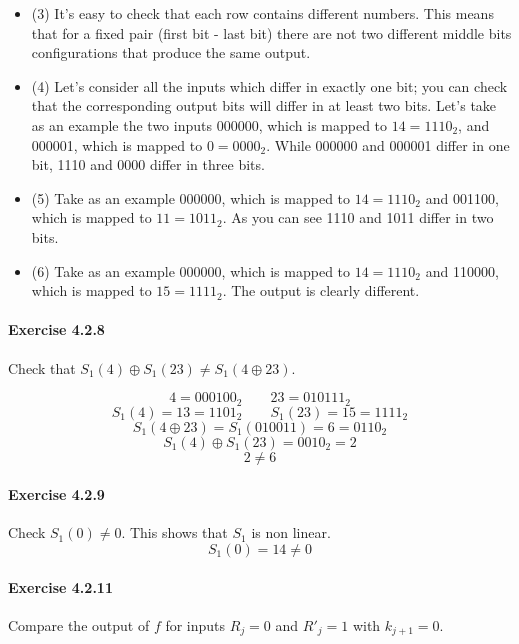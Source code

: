 \documentclass{article}
\begin{document}
  \begin{itemize}
	\item (3) It's easy to check that each row contains different
	  numbers. This means that for a fixed pair (first bit - last bit)
	  there are not two different middle bits configurations that produce the
	  same output.
	\item (4) Let's consider all the inputs which differ in exactly
	  one bit; you can check that the corresponding output bits will
	  differ in at least two bits. Let's take as an example the two
	  inputs 000000, which is mapped to 
	  $14 = 1110_{2}$, and 000001, which is mapped
	  to $0 = 0000_{2}$. While 000000 and
	  000001 differ in one bit, 1110 and
	  0000 differ in three bits.
	\item (5) Take as an example 000000, which is mapped to
	  $14 = 1110_{2}$ and 001100, which is mapped to 
	  $11 = 1011_{2}$. As you can see 1110 and
	  1011 differ in two bits.
	\item (6) Take as an example 000000, which is mapped to
	  $14 = 1110_{2}$ and 110000, which is mapped to
	$15 = 1111_{2}$. The output is clearly different.
  \end{itemize}

  \hypertarget{ex428}{\paragraph{Exercise 4.2.8}}

  Check that $S_{1}(4) \oplus S_{1}(23) \neq S_{1} (4 \oplus 23)$.

	  $$
		4 = 000100_{2}
		\qquad
		23 = 010111_{2}
	  $$
	  $$
		S_{1}(4) = 13 = 1101_{2}
		\qquad
		S_{1}(23) = 15 = 1111_{2}
	  $$
	  $$
		S_{1}(4 \oplus 23) = S_{1}(010011) = 6 = 0110_{2}
	  $$
	  $$
		S_{1}(4) \oplus S_{1}(23) = 0010_{2} = 2
	  $$
	  $$
		2 \neq 6
	  $$

	\hypertarget{ex429}{\paragraph{Exercise 4.2.9}}

	Check $S_{1}(0) \neq 0$. This shows that $S_{1}$ is non linear.
	$$
	  S_{1}(0) = 14 \neq 0
	$$

  \hypertarget{ex4211}{\paragraph{Exercise 4.2.11}}

  Compare the output of $f$ for inputs $R_{j} = 0$ and $R'_{j} = 1$
  with $k_{j+1} = 0$.
\end{document}
